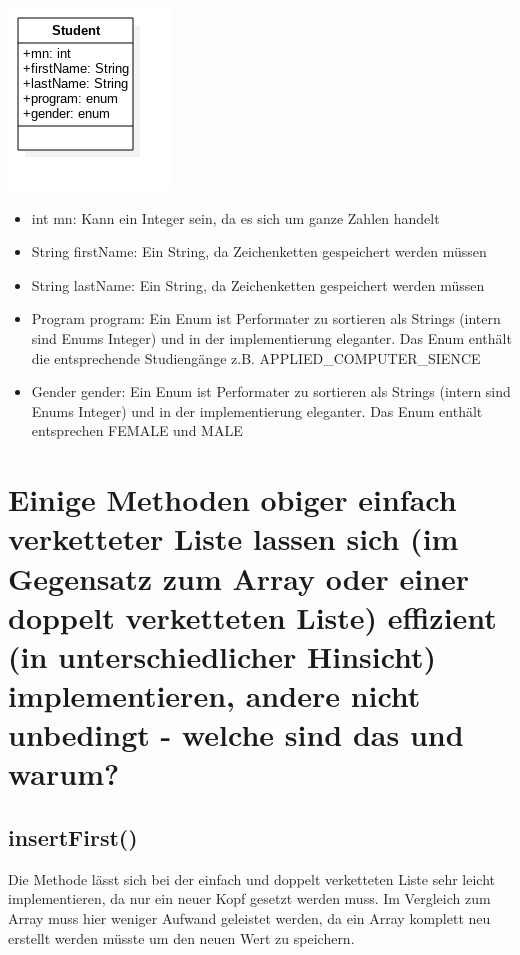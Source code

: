 \documentclass[a4paper, 11pt]{article}
\begin{document}
\begin{center}
    \includegraphics[width=0.5\linewidth]{Student}
\end{center}

\begin{itemize}
    \item int mn: Kann ein Integer sein, da es sich um ganze Zahlen handelt
    \item String firstName: Ein String, da Zeichenketten gespeichert werden müssen
    \item String lastName: Ein String, da Zeichenketten gespeichert werden müssen
    \item Program program: Ein Enum ist Performater zu sortieren als Strings (intern sind Enums Integer) und in der implementierung eleganter.
Das Enum enthält die entsprechende Studiengänge z.B. APPLIED\_COMPUTER\_SIENCE
    \item Gender gender: Ein Enum ist Performater zu sortieren als Strings (intern sind Enums Integer) und in der implementierung eleganter.
Das Enum enthält entsprechen FEMALE und MALE
\end{itemize}

\pagebreak

\section*{Einige Methoden obiger einfach verketteter Liste lassen sich (im Gegensatz zum
          Array oder einer doppelt verketteten Liste) effizient (in unterschiedlicher Hinsicht)
          implementieren, andere nicht unbedingt - welche sind das und warum?}

\subsection*{insertFirst()}
Die Methode lässt sich bei der einfach und doppelt verketteten Liste sehr leicht implementieren, da nur ein neuer Kopf
gesetzt werden muss. Im Vergleich zum Array muss hier weniger Aufwand geleistet werden, da ein Array komplett neu
erstellt werden müsste um den neuen Wert zu speichern.
\end{document}
